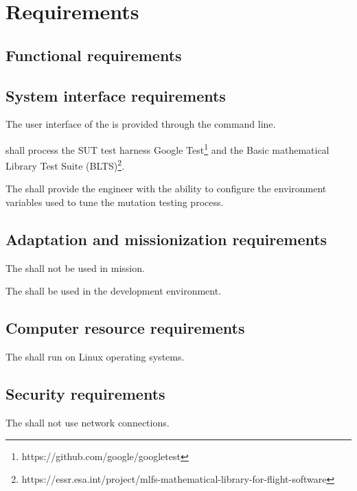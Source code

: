 \chapter{Requirements}

\section{Functional requirements}
\label{sec:requirements}






\section{System interface requirements}

\RQ{} The user interface of the \FAQAS is provided through the command line.

\RQ{} \FAQAS shall process the SUT test harness Google Test\footnote{https://github.com/google/googletest} and the Basic mathematical Library Test Suite (BLTS)\footnote{https://essr.esa.int/project/mlfs-mathematical-library-for-flight-software}.

\RQ{} The \FAQAS shall provide the engineer with the ability to configure the environment variables used to tune the mutation testing process.



\section{Adaptation and missionization requirements}

\RQ{} The \FAQAS shall not be used in mission.

\RQ{} The \FAQAS shall be used in the development environment.




\section{Computer resource requirements}


\RQ{} The \FAQAS shall run on Linux operating systems.



\section{Security requirements }

\RQ{} The \FAQAS shall not use network connections.

